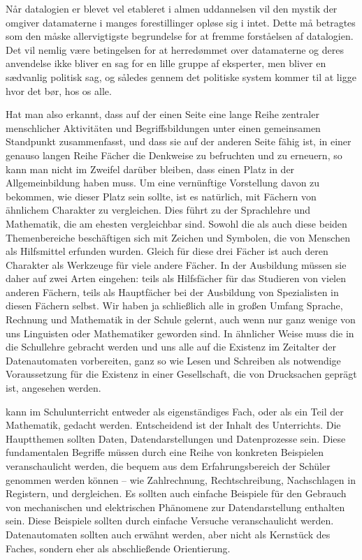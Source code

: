 {Når datalogien er blevet vel etableret i almen uddannelsen vil den mystik der omgiver datamaterne i manges forestillinger opløse sig i intet. Dette må betragtes som den måske allervigtigste begrundelse for at fremme forståelsen af datalogien. Det vil nemlig være betingelsen for at herredømmet over datamaterne og deres anvendelse ikke bliver en sag for en lille gruppe af eksperter, men bliver en sædvanlig politisk sag, og således gennem det politiske system kommer til at ligge hvor det bør, hos os alle.
}{
Hat man also erkannt, dass  auf der einen Seite eine lange Reihe zentraler menschlicher Aktivitäten und Begriffsbildungen unter einen gemeinsamen Standpunkt zusammenfasst, und dass sie auf der anderen Seite fähig ist, in einer genauso langen Reihe Fächer die Denkweise zu befruchten und zu erneuern, so kann man nicht im Zweifel darüber bleiben, dass  einen Platz in der Allgemeinbildung haben muss. Um eine vernünftige Vorstellung davon zu bekommen, wie dieser Platz sein sollte, ist es natürlich, mit Fächern von ähnlichem Charakter zu vergleichen. Dies führt zu der Sprachlehre und Mathematik, die am ehesten vergleichbar sind. Sowohl die  als auch diese beiden Themenbereiche beschäftigen sich mit Zeichen und Symbolen, die von Menschen als Hilfsmittel erfunden wurden. Gleich für diese drei Fächer ist auch deren Charakter als Werkzeuge für viele andere Fächer. In der Ausbildung müssen sie daher auf zwei Arten eingehen: teils als Hilfsfächer für das Studieren von vielen anderen Fächern, teils als Hauptfächer bei der Ausbildung von Spezialisten in diesen Fächern selbst. Wir haben ja schließlich alle in großen Umfang Sprache, Rechnung und Mathematik in der Schule gelernt, auch wenn nur ganz wenige von uns Linguisten oder Mathematiker geworden sind. In ähnlicher Weise muss die  in die Schullehre gebracht werden und uns alle auf die Existenz im Zeitalter der Datenautomaten vorbereiten, ganz so wie Lesen und Schreiben als notwendige Voraussetzung für die Existenz in einer Gesellschaft, die von Drucksachen geprägt ist, angesehen werden.

 kann im Schulunterricht entweder als eigenständiges Fach, oder als ein Teil der Mathematik, gedacht werden. Entscheidend ist der Inhalt des Unterrichts. Die Hauptthemen sollten Daten, Datendarstellungen und Datenprozesse sein. Diese fundamentalen Begriffe müssen durch eine Reihe von konkreten Beispielen veranschaulicht werden, die bequem aus dem Erfahrungsbereich der Schüler genommen werden können -- wie Zahlrechnung, Rechtschreibung, Nachschlagen in Registern, und dergleichen. Es sollten auch einfache Beispiele für den Gebrauch von mechanischen und elektrischen Phänomene zur Datendarstellung enthalten sein. Diese Beispiele sollten durch einfache Versuche veranschaulicht werden. Datenautomaten sollten auch erwähnt werden, aber nicht als Kernstück des Faches, sondern eher als abschließende Orientierung.  

}
